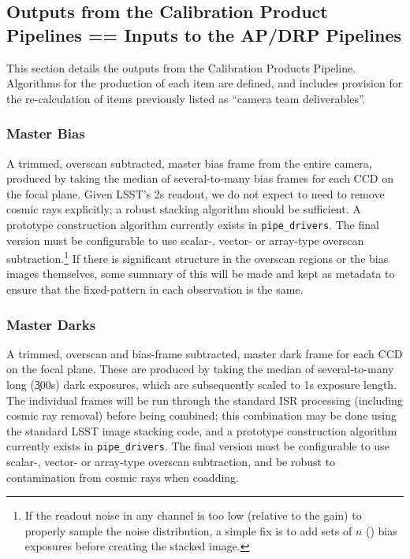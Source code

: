 \subsection{Outputs from the Calibration Product Pipelines == Inputs to the AP/DRP Pipelines}
\label{sec:CPP:output}

This section details the outputs from the Calibration Products Pipeline. Algorithms for the production of each item are defined, and includes provision for the re-calculation of items previously listed as ``camera team deliverables''.


\subsubsection{Master Bias}\label{sec:CPP:output:bias}
A trimmed, overscan subtracted, master bias frame from the entire camera, produced by taking the median of several-to-many bias frames for each CCD on the focal plane.
\alg Given LSST's 2s readout, we do not expect to need to remove cosmic rays explicitly; a robust stacking algorithm should be sufficient. A prototype construction algorithm currently exists in \texttt{pipe\_drivers}. The final version must be configurable to use scalar-, vector- or array-type overscan subtraction.\footnote{ If the readout noise in any channel is too low (relative to the gain) to properly sample the noise distribution, a simple fix is to add sets of $n$ () bias exposures before creating the stacked image.} If there is significant structure in the overscan regions or the bias images themselves, some summary of this will be made and kept as metadata to ensure that the fixed-pattern in each observation is the same.


\subsubsection{Master Darks}\label{sec:CPP:output:dark}
A trimmed, overscan and bias-frame subtracted, master dark frame for each CCD on the focal plane. These are produced by taking the median of several-to-many long (\c 300s) dark exposures, which are subsequently scaled to 1s exposure length.
\alg The individual frames will be run through the standard ISR processing (including cosmic ray removal) before
being combined; this combination may be done using the standard LSST image stacking code, and a prototype construction algorithm currently exists in \texttt{pipe\_drivers}. The final version must be configurable to use scalar-, vector- or array-type overscan subtraction, and be robust to contamination from cosmic rays when coadding.



